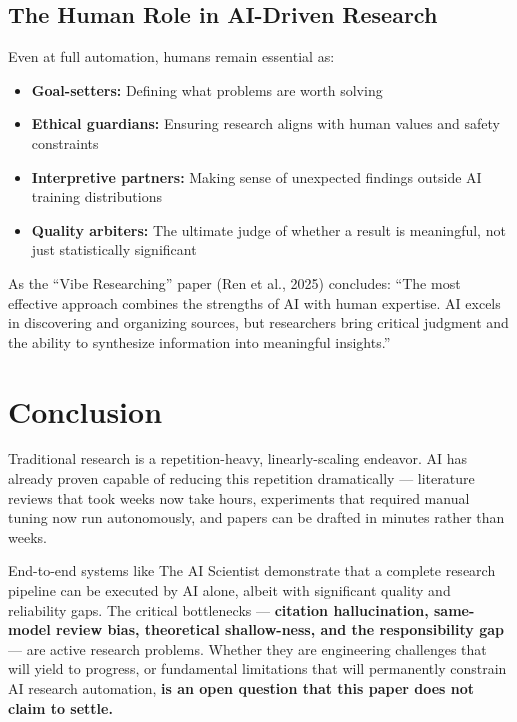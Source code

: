 \documentclass[11pt,a4paper]{article}
\begin{document}
\subsection{The Human Role in AI-Driven Research}

Even at full automation, humans remain essential as:
\begin{itemize}[leftmargin=2em]
    \item \textbf{Goal-setters:} Defining what problems are worth solving
    \item \textbf{Ethical guardians:} Ensuring research aligns with human values and safety constraints
    \item \textbf{Interpretive partners:} Making sense of unexpected findings outside AI training distributions
    \item \textbf{Quality arbiters:} The ultimate judge of whether a result is meaningful, not just statistically significant
\end{itemize}

As the ``Vibe Researching'' paper (Ren et al., 2025) concludes: ``The most effective approach combines the strengths of AI with human expertise. AI excels in discovering and organizing sources, but researchers bring critical judgment and the ability to synthesize information into meaningful insights.''

\section{Conclusion}

Traditional research is a repetition-heavy, linearly-scaling endeavor. AI has already proven capable of reducing this repetition dramatically --- literature reviews that took weeks now take hours, experiments that required manual tuning now run autonomously, and papers can be drafted in minutes rather than weeks.

End-to-end systems like The AI Scientist demonstrate that a complete research pipeline can be executed by AI alone, albeit with significant quality and reliability gaps. The critical bottlenecks --- \textbf{citation hallucination, same-model review bias, theoretical shallow-ness, and the responsibility gap} --- are active research problems. Whether they are engineering challenges that will yield to progress, or fundamental limitations that will permanently constrain AI research automation, \textbf{is an open question that this paper does not claim to settle.}
\end{document}
